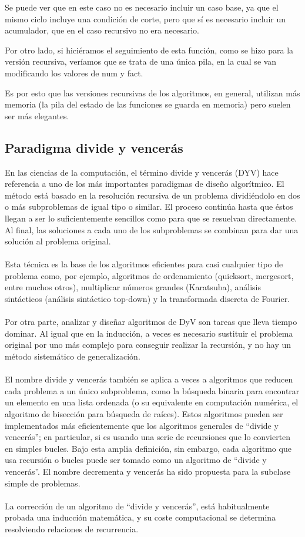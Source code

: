 \documentclass[12pt,twoside]{article}
\begin{document}
Se puede ver que en este caso no es necesario incluir un caso base, ya que el mismo ciclo incluye una condición de corte, pero que sí es necesario incluir un acumulador, que en el caso recursivo no era necesario.

Por otro lado, si hiciéramos el seguimiento de esta función, como se hizo para la versión recursiva, veríamos que se trata de una única pila, en la cual se van modificando los valores de num y fact.

Es por esto que las versiones recursivas de los algoritmos, en general, utilizan más memoria (la pila del estado de las funciones se guarda en memoria) pero suelen ser más elegantes.



\subsection{Paradigma divide y vencerás}
En las ciencias de la computación, el término divide y vencerás (DYV) hace referencia a uno de los más importantes paradigmas de diseño algorítmico. El método está basado en la resolución recursiva de un problema dividiéndolo en dos o más subproblemas de igual tipo o similar. El proceso continúa hasta que éstos llegan a ser lo suficientemente sencillos como para que se resuelvan directamente. Al final, las soluciones a cada uno de los subproblemas se combinan para dar una solución al problema original.
\\ \\
Esta técnica es la base de los algoritmos eficientes para casi cualquier tipo de problema como, por ejemplo, algoritmos de ordenamiento (quicksort, mergesort, entre muchos otros), multiplicar números grandes (Karatsuba), análisis sintácticos (análisis sintáctico top-down) y la transformada discreta de Fourier.
\\ \\
Por otra parte, analizar y diseñar algoritmos de DyV son tareas que lleva tiempo dominar. Al igual que en la inducción, a veces es necesario sustituir el problema original por uno más complejo para conseguir realizar la recursión, y no hay un método sistemático de generalización.
\\ \\
El nombre divide y vencerás también se aplica a veces a algoritmos que reducen cada problema a un único subproblema, como la búsqueda binaria para encontrar un elemento en una lista ordenada (o su equivalente en computación numérica, el algoritmo de bisección para búsqueda de raíces). Estos algoritmos pueden ser implementados más eficientemente que los algoritmos generales de “divide y vencerás”; en particular, si es usando una serie de recursiones que lo convierten en simples bucles. Bajo esta amplia definición, sin embargo, cada algoritmo que usa recursión o bucles puede ser tomado como un algoritmo de “divide y vencerás”. El nombre decrementa y vencerás ha sido propuesta para la subclase simple de problemas.
\\ \\
La corrección de un algoritmo de “divide y vencerás”, está habitualmente probada una inducción matemática, y su coste computacional se determina resolviendo relaciones de recurrencia.
\end{document}
